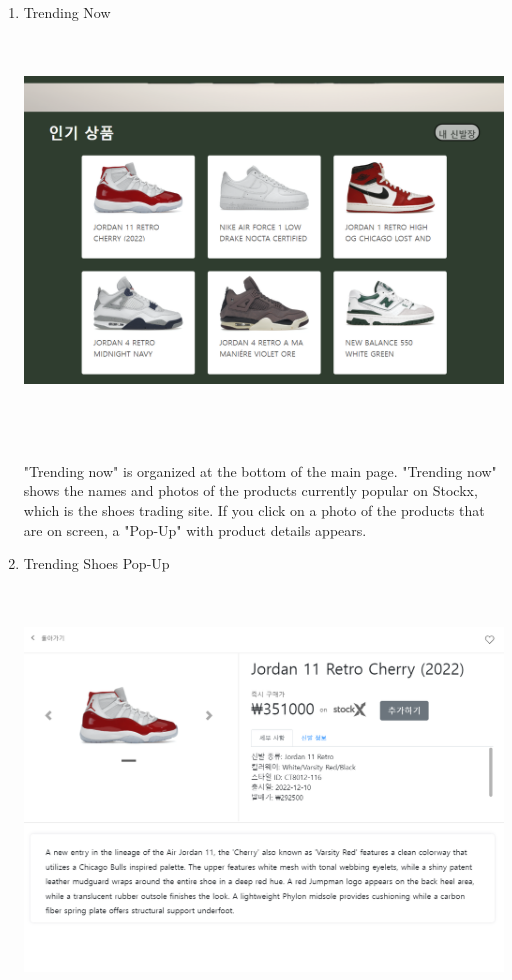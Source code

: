 \documentclass[conference]{IEEEtran}
\begin{document}
\begin{enumerate}
	\item Trending Now \\\\
\\\centerline{\includegraphics[scale=0.3]{pics/trending.png}}\\
\\\\ "Trending now" is organized at the bottom of the main page. "Trending now" shows the names and photos of the products currently popular on Stockx, which is the shoes trading site. If you click on a photo of the products that are on screen, a "Pop-Up" with product details appears.\\
	\item Trending Shoes Pop-Up\\\\
\\\centerline{\includegraphics[scale=0.33]{pics/trending_detail.png}}

\end{enumerate}
\end{document}
